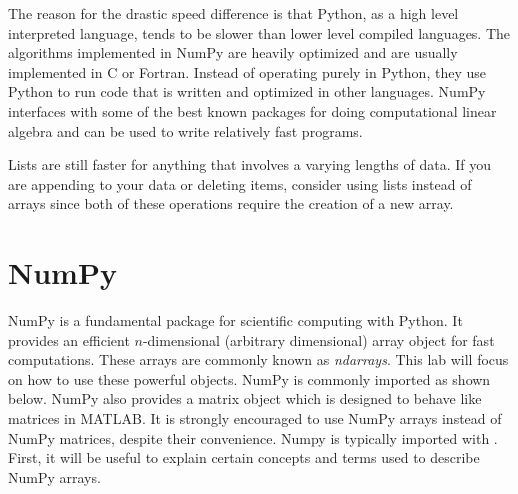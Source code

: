 %

The reason for the drastic speed difference is that Python, as a high level interpreted language, tends to be slower than lower level compiled languages.
The algorithms implemented in NumPy are heavily optimized and are usually implemented in C or Fortran.
Instead of operating purely in Python, they use Python to run code that is written and optimized in other languages.
NumPy interfaces with some of the best known packages for doing computational linear algebra and can be used to write relatively fast programs.

Lists are still faster for anything that involves a varying lengths of data.
If you are appending to your data or deleting items, consider using lists instead of arrays since both of these operations require the creation of a new array.

\section*{NumPy}
NumPy is a fundamental package for scientific computing with Python.
It provides an efficient $n$-dimensional (arbitrary dimensional) array object for fast computations.
These arrays are commonly known as \emph{ndarrays}.
This lab will focus on how to use these powerful objects.
NumPy is commonly imported as shown below.
NumPy also provides a matrix object which is designed to behave like matrices in MATLAB.
It is strongly encouraged to use NumPy arrays instead of NumPy matrices, despite their convenience.
Numpy is typically imported with .
First, it will be useful to explain certain concepts and terms used to describe NumPy arrays.


